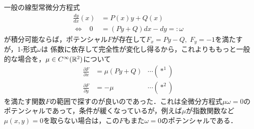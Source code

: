 \documentclass[uplatex,dvipdfmx]{jsreport}
\begin{document}
\begin{example}[積分因子による一般の線型常微分方程式の第一積分の構成法]
    一般の線型常微分方程式
    \begin{align*}
        \frac{dy}{dx}(x) &= P(x)y+Q(x)\\
        \Leftrightarrow\;\;\; 0&= (Py+Q)dx-dy =:\omega
    \end{align*}
    が積分可能ならば，ポテンシャル$F$が存在して$F_x=Py-Q,\;F_y=-1$を満たすが，1-形式$\omega$は
    係数に依存して完全性が変化し得るから，これよりももっと一般的な場合を，$\mu\in C^\infty(\mathbb{R}^2)$について
    \begin{align*}
        \frac{\partial F}{\partial x} &= \mu(Py+Q)&\cdots(*^1)\\
        \frac{\partial F}{\partial y} &= -\mu&\cdots(*^2)
    \end{align*}
    を満たす関数$F$の範囲で探すのが良いのであった．これは全微分方程式$\mu\omega=0$のポテンシャルであって，条件が緩くなっているが，例えば$\mu$が指数関数など$\mu(x,y)=0$を取らない場合は，この$F$もまた$\omega=0$のポテンシャルである．


\end{example}
\end{document}
